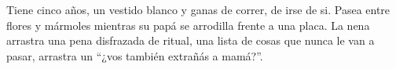 
Tiene cinco años, un vestido blanco y ganas de correr, de irse de si. Pasea
entre flores y mármoles mientras su papá se arrodilla frente a una placa. La
nena arrastra una pena disfrazada de ritual, una lista de cosas que nunca le
van a pasar, arrastra un ``¿vos también extrañás a mamá?''.
